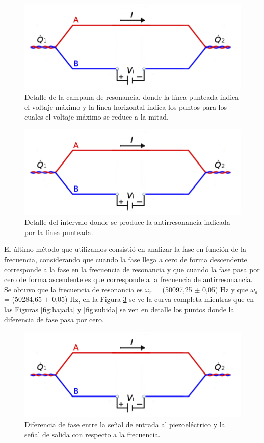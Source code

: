 \documentclass[twoside,twocolumn,a4paper]{article}
\begin{document}
\begin{figure}[H]
\includegraphics[width=\linewidth]{peltier.jpg}
\caption{Detalle de la campana de resonancia, donde la l\'inea punteada indica el voltaje m\'aximo y la l\'inea horizontal indica los puntos para los cuales el voltaje m\'aximo se reduce a la mitad.}
\label{fig:detalleRESamp}
\end{figure}


\begin{figure}[H]
\includegraphics[width=\linewidth]{peltier.jpg}
\caption{Detalle del intervalo donde se produce la antirresonancia indicada por la l\'inea punteada.}
\label{fig:detalleANTamp}
\end{figure}

El \'ultimo m\'etodo que utilizamos consisti\'o en analizar la fase en funci\'on de la frecuencia, considerando que cuando la fase llega a cero de forma descendente corresponde a la fase en la frecuencia de resonancia y que cuando la fase pasa por cero de forma ascendente es que corresponde a la frecuencia de antirresonancia. Se obtuvo que la frecuencia de resonancia es $\omega_{r}$ = (50097,25 $\pm$ 0,05) Hz y que $\omega_{a}$ = (50284,65 $\pm$ 0,05) Hz, en la Figura \ref{fig:fase} se ve la curva completa mientras que en las Figuras \ref{fig:bajada} y \ref{fig:subida} se ven en detalle los puntos donde la diferencia de fase pasa por cero. 

\begin{figure}[H]
\includegraphics[width=\linewidth]{peltier.jpg}
\caption{Diferencia de fase entre la se\~nal de entrada al piezoel\'ectrico y la se\~nal de salida con respecto a la frecuencia.}
\label{fig:fase}
\end{figure}
\end{document}
